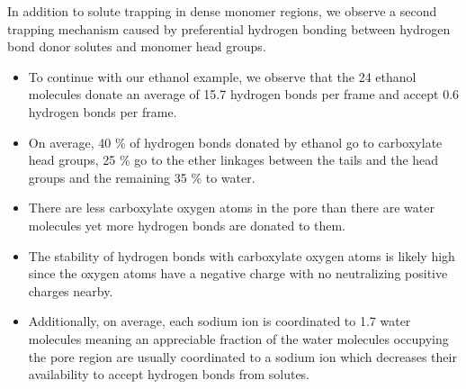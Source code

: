 \documentclass{article}
\begin{document}
  In addition to solute trapping in dense monomer regions, we observe a second
  trapping mechanism caused by preferential hydrogen bonding between 
  hydrogen bond donor solutes and monomer head groups. 
  \begin{itemize}
    \item To continue with our ethanol example, we observe that the 24 ethanol 
    molecules donate an average of 15.7 hydrogen bonds per frame and accept 
    0.6 hydrogen bonds per frame.
    \item On average, 40 \% of hydrogen bonds donated by ethanol go to 
    carboxylate head groups, 25 \% go to the ether linkages between the tails and
    the head groups and the remaining 35 \% to water.
    \item There are less carboxylate oxygen atoms in the pore than there are water
    molecules yet more hydrogen bonds are donated to them.
    \item The stability of hydrogen bonds with carboxylate oxygen atoms is likely
    high since the oxygen atoms have a negative charge with no neutralizing positive
    charges nearby.
    \item Additionally, on average, each sodium ion is coordinated to 1.7 water
    molecules meaning an appreciable fraction of the water molecules occupying 
    the pore region are usually coordinated to a sodium ion which decreases 
    their availability to accept hydrogen bonds from solutes.
  \end{itemize}
  
\end{document}
